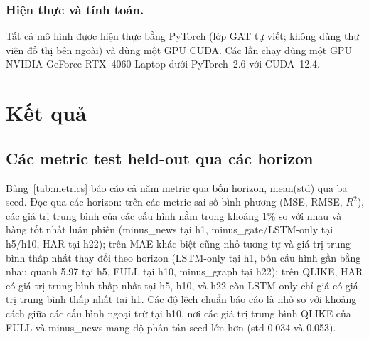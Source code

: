 \documentclass[runningheads]{llncs}
\begin{document}
\subsubsection{Hiện thực và tính toán.}
Tất cả mô hình được hiện thực bằng PyTorch (lớp GAT tự viết; không dùng thư viện đồ thị bên ngoài) và
dùng một GPU CUDA. Các lần chạy dùng một GPU NVIDIA GeForce RTX~4060 Laptop dưới PyTorch~2.6 với
CUDA~12.4.

\section{Kết quả}
\label{sec:results}

\subsection{Các metric test held-out qua các horizon}
\label{sec:metrics}
Bảng~\ref{tab:metrics} báo cáo cả năm metric qua bốn horizon, mean(std) qua ba seed. Đọc qua các horizon:
trên các metric sai số bình phương (MSE, RMSE, $R^2$), các giá trị trung bình của các cấu hình nằm trong
khoảng 1\% so với nhau và hàng tốt nhất luân phiên (minus\_news tại h1, minus\_gate/LSTM-only tại h5/h10,
HAR tại h22); trên MAE khác biệt cũng nhỏ tương tự và giá trị trung bình thấp nhất thay đổi theo horizon
(LSTM-only tại h1, bốn cấu hình gần bằng nhau quanh 5.97 tại h5, FULL tại h10, minus\_graph tại h22);
trên QLIKE, HAR có giá trị trung bình thấp nhất tại h5, h10, và h22 còn LSTM-only chỉ-giá có giá trị
trung bình thấp nhất tại h1. Các độ lệch chuẩn báo cáo là nhỏ so với khoảng cách giữa các cấu hình ngoại
trừ tại h10, nơi các giá trị trung bình QLIKE của FULL và minus\_news mang độ phân tán seed lớn hơn (std
0.034 và 0.053).
\end{document}
